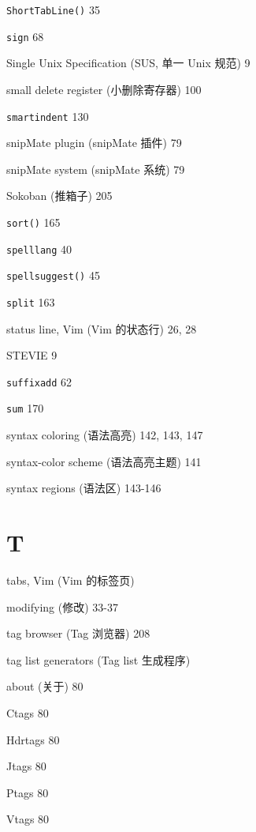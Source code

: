 \begin{multicols}{2}
\hangindent=2pc  \texttt{ShortTabLine()} 35

\hangindent=2pc  \texttt{sign} 68

\hangindent=2pc  Single Unix Specification (SUS, 单一 Unix 规范) 9

\hangindent=2pc  small delete register (小删除寄存器) 100

\hangindent=2pc  \texttt{smartindent} 130

\hangindent=2pc  snipMate plugin (snipMate 插件) 79

\hangindent=2pc  snipMate system (snipMate 系统) 79

\hangindent=2pc  Sokoban (推箱子) 205

\hangindent=2pc  \texttt{sort()} 165

\hangindent=2pc  \texttt{spelllang} 40

\hangindent=2pc  \texttt{spellsuggest()} 45

\hangindent=2pc  \texttt{split} 163

\hangindent=2pc  status line, Vim (Vim 的状态行) 26, 28

\hangindent=2pc  STEVIE 9

\hangindent=2pc  \texttt{suffixadd} 62

\hangindent=2pc  \texttt{sum} 170

\hangindent=2pc  syntax coloring (语法高亮) 142, 143, 147

\hangindent=2pc  syntax-color scheme (语法高亮主题) 141

\hangindent=2pc  syntax regions (语法区) 143-146

\hangindent=2pc  \section*{T}

\hangindent=2pc  tabs, Vim (Vim 的标签页) \par
\hangindent=2pc \quad modifying (修改) 33-37 \par

\hangindent=2pc  tag browser (Tag 浏览器) 208

\hangindent=2pc  tag list generators (Tag list 生成程序) \par
\hangindent=2pc \quad about (关于) 80 \par
\hangindent=2pc \quad Ctags 80 \par
\hangindent=2pc \quad Hdrtags 80 \par
\hangindent=2pc \quad Jtags 80 \par
\hangindent=2pc \quad Ptags 80 \par
\hangindent=2pc \quad Vtags 80 \par


\end{multicols}
